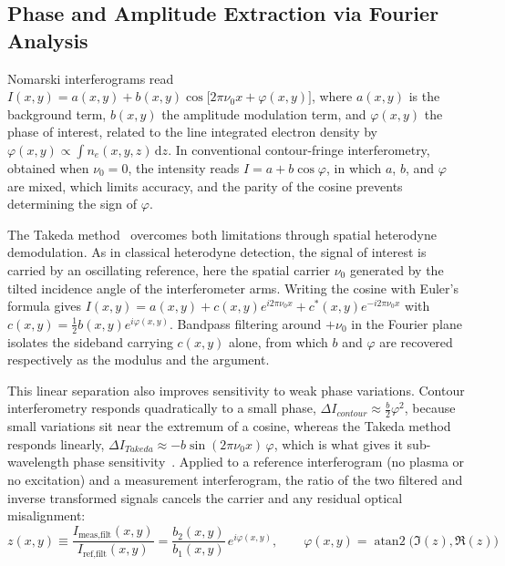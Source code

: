 \subsection{Phase and Amplitude Extraction via Fourier Analysis}

Nomarski interferograms read $I(x,y) = a(x,y) + b(x,y)\cos\!\big[2\pi\nu_0 x + \varphi(x,y)\big]$, where $a(x,y)$ is the background term, $b(x,y)$ the amplitude modulation term, and $\varphi(x,y)$ the phase of interest, related to the line integrated electron density by $\varphi(x,y) \propto \int n_e(x,y,z)\,\mathrm{d}z$. In conventional contour-fringe interferometry, obtained when $\nu_0=0$, the intensity reads $I = a + b\cos\varphi$, in which $a$, $b$, and $\varphi$ are mixed, which limits accuracy, and the parity of the cosine prevents determining the sign of $\varphi$.

The Takeda method~\cite{takeda1982fourier} overcomes both limitations through spatial heterodyne demodulation. As in classical heterodyne detection, the signal of interest is carried by an oscillating reference, here the spatial carrier $\nu_0$ generated by the tilted incidence angle of the interferometer arms. Writing the cosine with Euler's formula gives $I(x,y) = a(x,y) + c(x,y)e^{i2\pi\nu_0 x} + c^*(x,y)e^{-i2\pi\nu_0 x}$ with $c(x,y) = \tfrac{1}{2}b(x,y)e^{i\varphi(x,y)}$. Bandpass filtering around $+\nu_0$ in the Fourier plane isolates the sideband carrying $c(x,y)$ alone, from which $b$ and $\varphi$ are recovered respectively as the modulus and the argument.

This linear separation also improves sensitivity to weak phase variations. Contour interferometry responds quadratically to a small phase, $\Delta I_{contour} \approx \tfrac{b}{2}\varphi^2$, because small variations sit near the extremum of a cosine, whereas the Takeda method responds linearly, $\Delta I_{Takeda} \approx -b\sin(2\pi\nu_0 x)\,\varphi$, which is what gives it sub-wavelength phase sensitivity~\cite{takeda1982fourier}. Applied to a reference interferogram (no plasma or no excitation) and a measurement interferogram, the ratio of the two filtered and inverse transformed signals cancels the carrier and any residual optical misalignment:
\begin{equation}
z(x,y) \equiv \frac{I_{\text{meas,filt}}(x,y)}{I_{\text{ref,filt}}(x,y)} = \frac{b_2(x,y)}{b_1(x,y)}\,e^{i\varphi(x,y)}, \qquad
\boxed{\varphi(x,y) = \operatorname{atan2}\big(\Im{(z)},\Re{(z)}\big)}
\end{equation}

